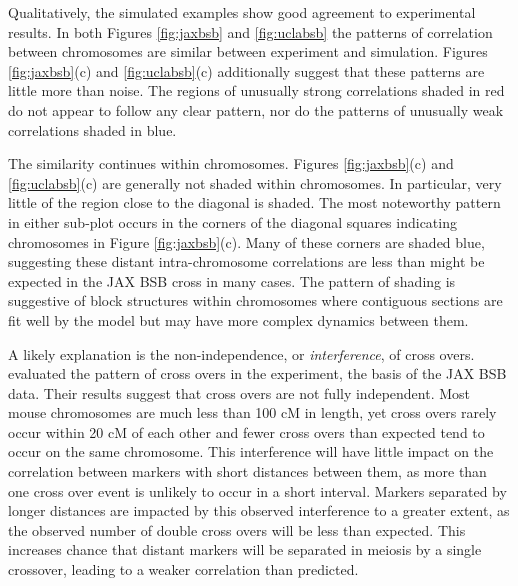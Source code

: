 \documentclass[sts]{imsart}
\begin{document}
Qualitatively, the simulated examples show good agreement to experimental results. In both Figures \ref{fig:jaxbsb} and \ref{fig:uclabsb} the patterns of correlation between chromosomes are similar between experiment and simulation. Figures \ref{fig:jaxbsb}(c) and \ref{fig:uclabsb}(c) additionally suggest that these patterns are little more than noise. The regions of unusually strong correlations shaded in red do not appear to follow any clear pattern, nor do the patterns of unusually weak correlations shaded in blue.

The similarity continues within chromosomes. Figures \ref{fig:jaxbsb}(c) and \ref{fig:uclabsb}(c) are generally not shaded within chromosomes. In particular, very little of the region close to the diagonal is shaded. The most noteworthy pattern in either sub-plot occurs in the corners of the diagonal squares indicating chromosomes in Figure \ref{fig:jaxbsb}(c). Many of these corners are shaded blue, suggesting these distant intra-chromosome correlations are less than might be expected in the JAX BSB cross in many cases. The pattern of shading is suggestive of block structures within chromosomes where contiguous sections are fit well by the model but may have more complex dynamics between them. 

A likely explanation is the non-independence, or \emph{interference}, of cross overs. \cite{bromanetal2002crossover} evaluated the pattern of cross overs in the \cite{roweetal1994jaxbsb} experiment, the basis of the JAX BSB data. Their results suggest that cross overs are not fully independent. Most mouse chromosomes are much less than 100 cM in length, yet cross overs rarely occur within 20 cM of each other and fewer cross overs than expected tend to occur on the same chromosome. This interference will have little impact on the correlation between markers with short distances between them, as more than one cross over event is unlikely to occur in a short interval. Markers separated by longer distances are impacted by this observed interference to a greater extent, as the observed number of double cross overs will be less than expected. This increases chance that distant markers will be separated in meiosis by a single crossover, leading to a weaker correlation than predicted.
\end{document}
